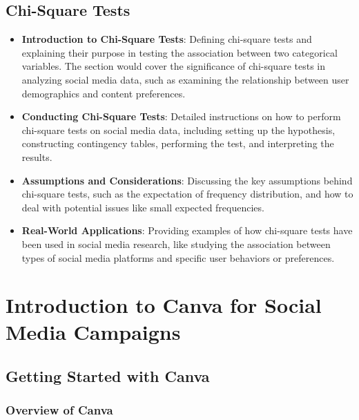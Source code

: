 \documentclass[
]{book}
\providecommand{\tightlist}{%
  \setlength{\itemsep}{0pt}\setlength{\parskip}{0pt}}
\begin{document}
\hypertarget{chi-square-tests}{%
\section*{Chi-Square Tests}\label{chi-square-tests}}

\begin{itemize}
\tightlist
\item
  \textbf{Introduction to Chi-Square Tests}: Defining chi-square tests and explaining their purpose in testing the association between two categorical variables. The section would cover the significance of chi-square tests in analyzing social media data, such as examining the relationship between user demographics and content preferences.
\item
  \textbf{Conducting Chi-Square Tests}: Detailed instructions on how to perform chi-square tests on social media data, including setting up the hypothesis, constructing contingency tables, performing the test, and interpreting the results.
\item
  \textbf{Assumptions and Considerations}: Discussing the key assumptions behind chi-square tests, such as the expectation of frequency distribution, and how to deal with potential issues like small expected frequencies.
\item
  \textbf{Real-World Applications}: Providing examples of how chi-square tests have been used in social media research, like studying the association between types of social media platforms and specific user behaviors or preferences.
\end{itemize}

\hypertarget{introduction-to-canva-for-social-media-campaigns}{%
\chapter{Introduction to Canva for Social Media Campaigns}\label{introduction-to-canva-for-social-media-campaigns}}

\hypertarget{getting-started-with-canva}{%
\section{Getting Started with Canva}\label{getting-started-with-canva}}

\hypertarget{overview-of-canva}{%
\subsection*{Overview of Canva}\label{overview-of-canva}}
\end{document}
